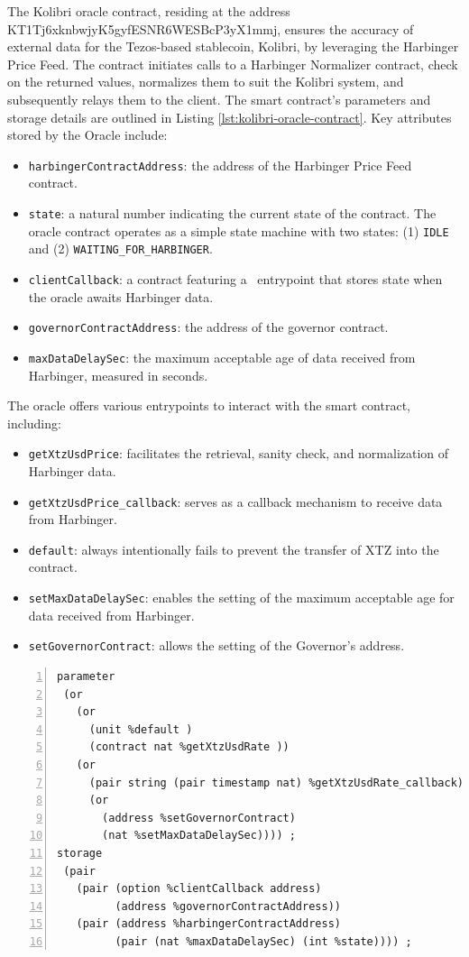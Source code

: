 \documentclass[a4paper,UKenglish,cleveref, autoref, thm-restate]{lipics-v2021}
\begin{document}
The Kolibri oracle contract,  residing at the address KT1Tj6xknbwjyK5gyfESNR6WESBcP3yX1mmj, ensures the accuracy of external data for the Tezos-based stablecoin, Kolibri, by leveraging the Harbinger Price Feed. The contract initiates calls to a Harbinger Normalizer contract, check  on the returned values, normalizes them to suit the Kolibri system, and subsequently relays them to the client. The smart contract's parameters and storage details are outlined in Listing \ref{lst:kolibri-oracle-contract}. Key attributes stored by the Oracle include:
\begin{itemize}
\item \lstinline/harbingerContractAddress/: the address of the Harbinger Price Feed contract.
 \item    \lstinline/state/: a natural number indicating the current state of the contract. The oracle contract operates as a simple state machine with two states: (1) \lstinline/IDLE/ and (2) \lstinline/WAITING_FOR_HARBINGER/.
 \item    \lstinline/clientCallback/: a contract featuring a \TNAT\ entrypoint that stores state when the oracle awaits Harbinger data.
 \item    \lstinline/governorContractAddress/: the address of the governor contract.
 \item    \lstinline/maxDataDelaySec/: the maximum acceptable age of data received from Harbinger, measured in seconds.
\end{itemize}
The oracle offers various entrypoints to interact with the smart contract, including:
\begin{itemize}
\item    \lstinline/getXtzUsdPrice/: facilitates the retrieval, sanity check, and normalization of Harbinger data.
\item    \lstinline/getXtzUsdPrice_callback/: serves as a callback mechanism to receive data from Harbinger.
\item    \lstinline/default/: always intentionally fails to prevent the transfer of XTZ into the contract.
\item    \lstinline/setMaxDataDelaySec/: enables the setting of the maximum acceptable age for data received from Harbinger.
\item    \lstinline/setGovernorContract/: allows the setting of the Governor's address.
\end{itemize}

\begin{lstlisting}[float,captionpos=b,caption={Kolibri oracle contract},label={lst:kolibri-oracle-contract},numbers=left]
parameter
 (or
   (or
     (unit %default )
     (contract nat %getXtzUsdRate ))
   (or
     (pair string (pair timestamp nat) %getXtzUsdRate_callback)
     (or
       (address %setGovernorContract)
       (nat %setMaxDataDelaySec)))) ;
storage
 (pair
   (pair (option %clientCallback address) 
         (address %governorContractAddress))
   (pair (address %harbingerContractAddress) 
         (pair (nat %maxDataDelaySec) (int %state)))) ;
\end{lstlisting}
\end{document}
